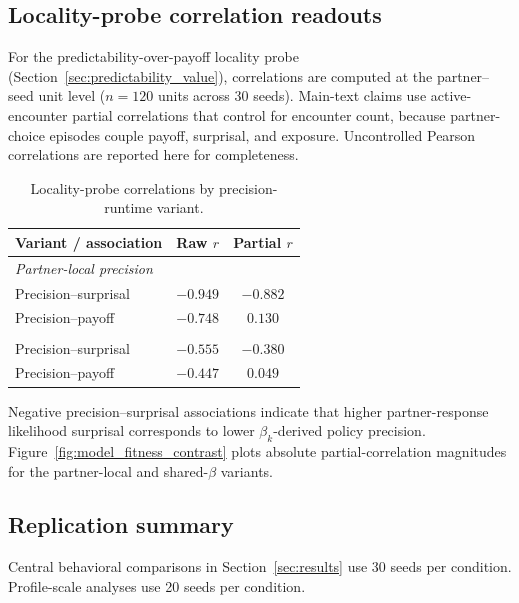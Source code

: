 \subsection{Locality-probe correlation readouts}
\label{sec:locality_correlations}

For the predictability-over-payoff locality probe (Section~\ref{sec:predictability_value}), correlations are computed at the partner--seed unit level ($n=120$ units across 30 seeds). Main-text claims use active-encounter partial correlations that control for encounter count, because partner-choice episodes couple payoff, surprisal, and exposure. Uncontrolled Pearson correlations are reported here for completeness.

\begin{table}[H]
\centering
\caption{Locality-probe correlations by precision-runtime variant.}
\label{tab:locality_correlations}
\begin{tabular}{lcc}
\toprule
Variant / association & Raw $r$ & Partial $r$ \\
\midrule
\multicolumn{3}{l}{\textit{Partner-local precision}} \\
\quad Precision--surprisal & $-0.949$ & $-0.882$ \\
\quad Precision--payoff & $-0.748$ & $0.130$ \\
\addlinespace
\multicolumn{3}{l}{\textit{Shared-$\beta$ ablation}} \\
\quad Precision--surprisal & $-0.555$ & $-0.380$ \\
\quad Precision--payoff & $-0.447$ & $0.049$ \\
\bottomrule
\end{tabular}
\end{table}

Negative precision--surprisal associations indicate that higher partner-response likelihood surprisal corresponds to lower $\beta_k$-derived policy precision. Figure~\ref{fig:model_fitness_contrast} plots absolute partial-correlation magnitudes for the partner-local and shared-$\beta$ variants.

\subsection{Replication summary}

Central behavioral comparisons in Section~\ref{sec:results} use 30 seeds per condition. Profile-scale analyses use 20 seeds per condition.

